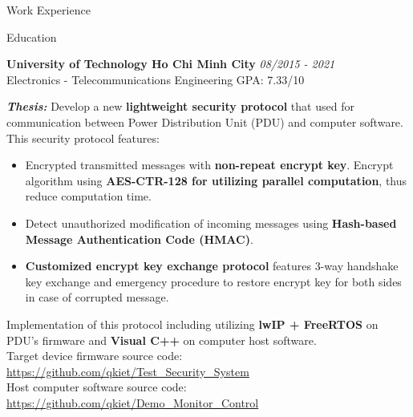 \documentclass{resume} %
\begin{document}
\begin{rSection}{Work Experience}
\begin{rCompanySubsection}
\begin{itemize}
\end{itemize}
\end{rCompanySubsection}




\end{rSection}
\begin{rSection}{Education}

{\bf University of Technology Ho Chi Minh City} \hfill {\em 08/2015 - 2021}
\\ Electronics - Telecommunications Engineering\hfill { GPA: 7.33/10 }


\textbf{\textit{Thesis:}} Develop a new \textbf{lightweight security protocol} that used for communication between Power Distribution Unit (PDU) and computer software. This security protocol features:
\begin{itemize}
    \item Encrypted transmitted messages with \textbf{non-repeat encrypt key}. Encrypt algorithm using \textbf{AES-CTR-128 for utilizing parallel computation}, thus reduce computation time.
    \item Detect unauthorized modification of incoming messages using \textbf{Hash-based Message Authentication Code (HMAC)}.
    \item \textbf{Customized encrypt key exchange protocol} features 3-way handshake key exchange and emergency procedure to restore encrypt key for both sides in case of corrupted message.
\end{itemize}
Implementation of this protocol including utilizing \textbf{lwIP + FreeRTOS} on PDU's firmware and \textbf{Visual C++} on computer host software.\\
Target device firmware source code: \href{https://github.com/qkiet/Test_Security_System}{https://github.com/qkiet/Test\_Security\_System}\\
Host computer software source code:
\href{https://github.com/qkiet/Demo_Monitor_Control}{https://github.com/qkiet/Demo\_Monitor\_Control}\


\end{rSection}
\end{document}

